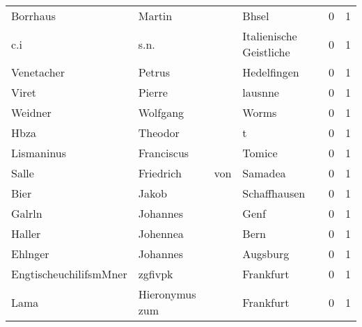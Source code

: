 \begin{center}
\begin{tiny}
\begin{longtabu}{llllrr}
                 Borrhaus &                             Martin &             &                                       Bhsel &          0 &         1 \\
                      c.i &                               s.n. &             &                     Italienische Geistliche &          0 &         1 \\
               Venetacher &                             Petrus &             &                                 Hedelfingen &          0 &         1 \\
                    Viret &                             Pierre &             &                                     lausnne &          0 &         1 \\
                  Weidner &                           Wolfgang &             &                                       Worms &          0 &         1 \\
                     Hbza &                            Theodor &             &                                           t &          0 &         1 \\
               Lismaninus &                         Franciscus &             &                                      Tomice &          0 &         1 \\
                    Salle &                          Friedrich &         von &                                     Samadea &          0 &         1 \\
                     Bier &                              Jakob &             &                                Schaffhausen &          0 &         1 \\
                   Galrln &                           Johannes &             &                                        Genf &          0 &         1 \\
                   Haller &                           Johennea &             &                                        Bern &          0 &         1 \\
                  Ehlnger &                           Johannes &             &                                    Augsburg &          0 &         1 \\
   EngtischeuchilifsmMner &                            zgfivpk &             &                                   Frankfurt &          0 &         1 \\
                     Lama &                     Hieronymus zum &             &                                   Frankfurt &          0 &         1 \\

\end{longtabu}
\end{tiny}
\end{center}
